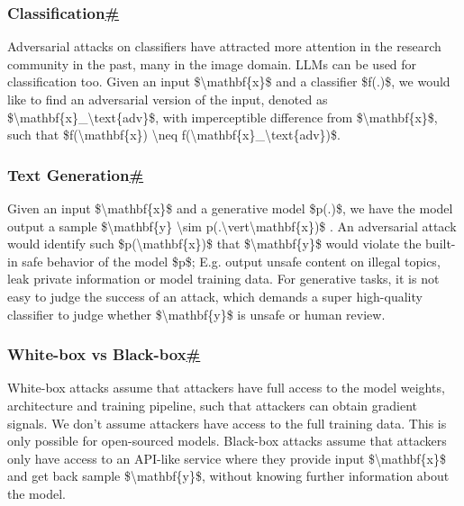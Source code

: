 \subsubsection{\texorpdfstring{Classification\hyperref[classification]{\#}}{Classification\#}}\label{classification}

Adversarial attacks on classifiers have attracted more attention in the research community in the past, many in the image domain. LLMs can be used for classification too. Given an input \$\textbackslash mathbf\{x\}\$ and a classifier \$f(.)\$, we would like to find an adversarial version of the input, denoted as \$\textbackslash mathbf\{x\}\_\textbackslash text\{adv\}\$, with imperceptible difference from \$\textbackslash mathbf\{x\}\$, such that \$f(\textbackslash mathbf\{x\}) \textbackslash neq f(\textbackslash mathbf\{x\}\_\textbackslash text\{adv\})\$.

\subsubsection{\texorpdfstring{Text Generation\hyperref[text-generation]{\#}}{Text Generation\#}}\label{text-generation}

Given an input \$\textbackslash mathbf\{x\}\$ and a generative model \$p(.)\$, we have the model output a sample \$\textbackslash mathbf\{y\} \textbackslash sim p(.\textbackslash vert\textbackslash mathbf\{x\})\$ . An adversarial attack would identify such \$p(\textbackslash mathbf\{x\})\$ that \$\textbackslash mathbf\{y\}\$ would violate the built-in safe behavior of the model \$p\$; E.g. output unsafe content on illegal topics, leak private information or model training data. For generative tasks, it is not easy to judge the success of an attack, which demands a super high-quality classifier to judge whether \$\textbackslash mathbf\{y\}\$ is unsafe or human review.

\subsubsection{\texorpdfstring{White-box vs Black-box\hyperref[white-box-vs-black-box]{\#}}{White-box vs Black-box\#}}\label{white-box-vs-black-box}

White-box attacks assume that attackers have full access to the model weights, architecture and training pipeline, such that attackers can obtain gradient signals. We don't assume attackers have access to the full training data. This is only possible for open-sourced models. Black-box attacks assume that attackers only have access to an API-like service where they provide input \$\textbackslash mathbf\{x\}\$ and get back sample \$\textbackslash mathbf\{y\}\$, without knowing further information about the model.


